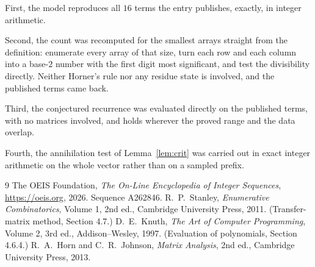 \documentclass[11pt,a4paper]{article}
\theoremstyle{plain}
\theoremstyle{definition}
\begin{document}
First, the model reproduces all $16$ terms the entry publishes, exactly, in integer
arithmetic.

Second, the count was recomputed for the smallest arrays straight from the definition:
enumerate every array of that size, turn each row and each column into a base-$2$ number with
the first digit most significant, and test the divisibility directly. Neither Horner's rule nor
any residue state is involved, and the published terms came back.

Third, the conjectured recurrence was evaluated directly on the published terms, with no
matrices involved, and holds wherever the proved range and the data overlap.

Fourth, the annihilation test of Lemma~\ref{lem:crit} was carried out in exact integer
arithmetic on the whole vector rather than on a sampled prefix.

\begin{thebibliography}{9}
 The OEIS Foundation, \emph{The On-Line Encyclopedia of Integer
Sequences}, \url{https://oeis.org}, 2026. Sequence A262846.
 R.~P.~Stanley, \emph{Enumerative Combinatorics}, Volume 1, 2nd ed.,
Cambridge University Press, 2011. (Transfer-matrix method, Section 4.7.)
 D.~E.~Knuth, \emph{The Art of Computer Programming}, Volume 2, 3rd ed.,
Addison--Wesley, 1997. (Evaluation of polynomials, Section 4.6.4.)
 R.~A.~Horn and C.~R.~Johnson, \emph{Matrix Analysis}, 2nd ed., Cambridge
University Press, 2013.
\end{thebibliography}
\end{document}
